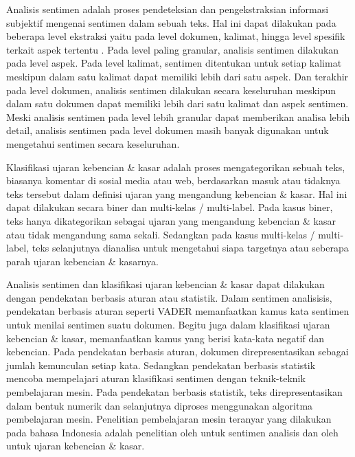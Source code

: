 Analisis sentimen adalah proses pendeteksian dan pengekstraksian informasi subjektif mengenai sentimen dalam sebuah teks. Hal ini dapat dilakukan pada beberapa level ekstraksi yaitu pada level dokumen, kalimat, hingga level spesifik terkait aspek tertentu \parencite{Liu2012}. Pada level paling granular, analisis sentimen dilakukan pada level aspek. Pada level kalimat, sentimen ditentukan untuk setiap kalimat meskipun dalam satu kalimat dapat memiliki lebih dari satu aspek. Dan terakhir pada level dokumen, analisis sentimen dilakukan secara keseluruhan meskipun dalam satu dokumen dapat memiliki lebih dari satu kalimat dan aspek sentimen. Meski analisis sentimen pada level lebih granular dapat memberikan analisa lebih detail, analisis sentimen pada level dokumen masih banyak digunakan untuk mengetahui sentimen secara keseluruhan.

Klasifikasi ujaran kebencian \& kasar adalah proses mengategorikan sebuah teks, biasanya komentar di sosial media atau web, berdasarkan masuk atau tidaknya teks tersebut dalam definisi ujaran yang mengandung kebencian \& kasar. Hal ini dapat dilakukan secara biner dan multi-kelas / multi-label. Pada kasus biner, teks hanya dikategorikan sebagai ujaran yang mengandung kebencian \& kasar atau tidak mengandung sama sekali. Sedangkan pada kasus multi-kelas / multi-label, teks selanjutnya dianalisa untuk mengetahui siapa targetnya atau seberapa parah ujaran kebencian \& kasarnya.

Analisis sentimen dan klasifikasi ujaran kebencian \& kasar dapat dilakukan dengan pendekatan berbasis aturan atau statistik. Dalam sentimen analisisis, pendekatan berbasis aturan seperti VADER \parencite{VADER} memanfaatkan kamus kata sentimen untuk menilai sentimen suatu dokumen. Begitu juga dalam klasifikasi ujaran kebencian \& kasar, \parencite{lexicon_hatespeech_2015} memanfaatkan kamus yang berisi kata-kata negatif dan kebencian. Pada pendekatan berbasis aturan, dokumen direpresentasikan sebagai jumlah kemunculan setiap kata. Sedangkan pendekatan berbasis statistik mencoba mempelajari aturan klasifikasi sentimen dengan teknik-teknik pembelajaran mesin. Pada pendekatan berbasis statistik, teks direpresentasikan dalam bentuk numerik dan selanjutnya diproses menggunakan algoritma pembelajaran mesin. Penelitian pembelajaran mesin teranyar yang dilakukan pada bahasa Indonesia adalah penelitian oleh \parencite{CrisdayantiPurwarianti2019} untuk sentimen analisis dan oleh \parencite{Ibrohim_Budi_2019} untuk ujaran kebencian \& kasar.

